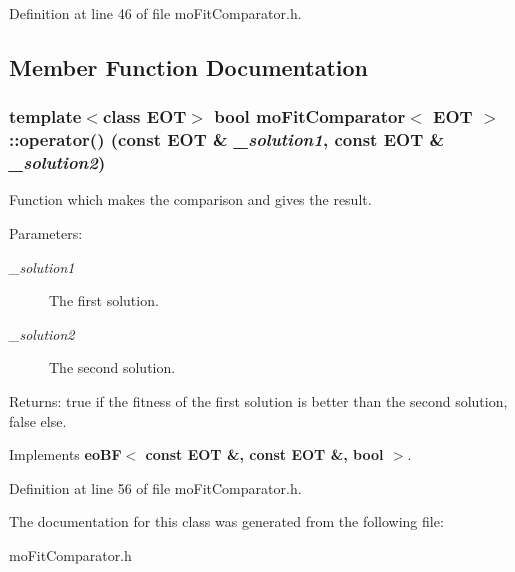 Definition at line 46 of file mo\-Fit\-Comparator.h.

\subsection{Member Function Documentation}
\subsubsection{\setlength{\rightskip}{0pt plus 5cm}template$<$class EOT$>$ bool {\bf mo\-Fit\-Comparator}$<$ EOT $>$::operator() (const EOT \& {\em \_\-solution1}, const EOT \& {\em \_\-solution2})\hspace{0.3cm}{\tt  [inline, virtual]}}\label{classmo_fit_comparator_a0}


Function which makes the comparison and gives the result. 

\begin{Desc}
\item[Parameters:]
\begin{description}
\item[{\em \_\-solution1}]The first solution. \item[{\em \_\-solution2}]The second solution. \end{description}
\end{Desc}
\begin{Desc}
\item[Returns:]true if the fitness of the first solution is better than the second solution, false else. \end{Desc}


Implements {\bf eo\-BF$<$ const EOT \&, const EOT \&, bool $>$}.

Definition at line 56 of file mo\-Fit\-Comparator.h.

The documentation for this class was generated from the following file:\begin{CompactItemize}
\item 
mo\-Fit\-Comparator.h\end{CompactItemize}
